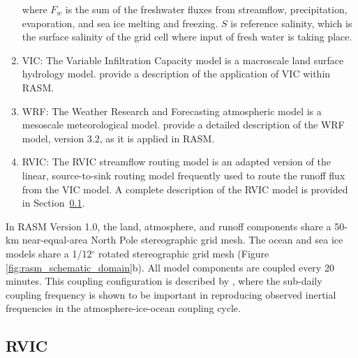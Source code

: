 \documentclass[jgrga, draft]{agutex}
\begin{document}
\begin{article}
\begin{enumerate}
where $F_w$ is the sum of the freshwater fluxes from streamflow, precipitation, evaporation, and sea ice melting and freezing. $S$ is reference salinity, which is the surface salinity of the grid cell where input of fresh water is taking place. %

\item VIC: The Variable Infiltration Capacity model \citep{Liang_1994} is a macroscale land surface hydrology model.
\citet{Hamman_2016} provide a description of the application of VIC within RASM.
\item WRF: The Weather Research and Forecasting atmospheric model \citep{Skamarock_2007} is a mesoscale meteorological model.
\citet{Cassano_2016} provide a detailed description of the WRF model, version 3.2, as it is applied in RASM.
\item RVIC: The RVIC streamflow routing model is an adapted version of the \citet{Lohmann_1996} linear, source-to-sink routing model frequently used to route the runoff flux from the VIC model.
A complete description of the RVIC model is provided in Section~\ref{sec:rvic}.
\end{enumerate}

In RASM Version 1.0, the land, atmosphere, and runoff components share a 50-km near-equal-area North Pole stereographic grid mesh.
The ocean and sea ice models share a 1/12$^{\circ}$ rotated stereographic grid mesh (Figure \ref{fig:rasm_schematic_domain}b).
All model components are coupled every 20 minutes.
This coupling configuration is described by \citet{Roberts_2015a}, where the sub-daily coupling frequency is shown to be important in reproducing observed inertial frequencies in the atmosphere-ice-ocean coupling cycle.

\subsection{RVIC}
\label{sec:rvic}


\end{article}
\end{document}
